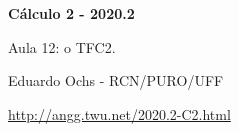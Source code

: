 \documentclass[oneside,12pt]{article}
\begin{document}

\def\TFCtwo{
  \iequationbox {\Intx{a}{b}{F'(x)}}
                {\Difmx{a}{b}{F(x)}}
}
\def\TFCtwoI{
  \iequationbox {\intx{F'(x)}}
                {F(x)}
}

\def\Sone{
  \isubstbox
    {\Difmx{a}{b}{f(g(x))}}  {\Intx{a}{b}{f'(g(x))g'(x)}}
    {\ph{mmm}}
    {\Difmu{g(a)}{g(b)}{f(u)}} {\Intu{g(a)}{g(b)}{f'(u)}}
}
\def\SoneI{
  \isubstbox
    {f(g(x))} {\intx{f'(g(x))g'(x)}}
    {\ph{m}}
    {f(u)}    {\intu{f'(u)}}
}

\def\Stwo{
  \isubstboxT
    {\Difmx{a}{b}{F(g(x))}}   {\Intx{a}{b}{f(g(x))g'(x)}}
    {\ph{mmm}}
    {\Difmu{g(a)}{g(b)}{F(u)}}  {\Intu{g(a)}{g(b)}{f(u)}}
    {Se $F'(u)=f(u)$ então:}
}
\def\StwoI{
  \isubstboxT
    {F(g(x))}  {\intx{f(g(x))g'(x)}}
    {\ph{m}}
    {F(u)}     {\intu{f(u)}}
    {Se $F'(u)=f(u)$ então:}
}

\def\Sthree{
  \iequationbox {\Intx{a}{b}{f(g(x))g'(x)}}
                {\Intu{g(a)}{g(b)}{f(u)}}
}
\def\SthreeI{
  \iequationbox {\intx{f(g(x))g'(x)}}
                {\intu{f(u)}
                 \qquad [u=g(x)]
                }
}

\def\Sthree{
  \pmat{
    \D \Intx{a}{b}{f(g(x))g'(x)} \\
    \veq \\
    \D \Intu{g(a)}{g(b)}{f(u)}
  }}



%

\thispagestyle{empty}

\begin{center}

\vspace*{1.2cm}

{\bf \Large Cálculo 2 - 2020.2}

\bsk

Aula 12: o TFC2.

\bsk

Eduardo Ochs - RCN/PURO/UFF

\url{http://angg.twu.net/2020.2-C2.html}

\end{center}
\end{document}
